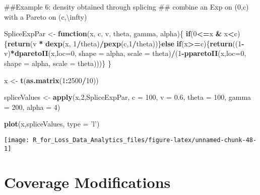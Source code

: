 \documentclass[]{book}
\newenvironment{Shaded}{\begin{snugshade}}{\end{snugshade}}
\newcommand{\KeywordTok}[1]{\textcolor[rgb]{0.13,0.29,0.53}{\textbf{#1}}}
\newcommand{\DataTypeTok}[1]{\textcolor[rgb]{0.13,0.29,0.53}{#1}}
\newcommand{\DecValTok}[1]{\textcolor[rgb]{0.00,0.00,0.81}{#1}}
\newcommand{\FloatTok}[1]{\textcolor[rgb]{0.00,0.00,0.81}{#1}}
\newcommand{\StringTok}[1]{\textcolor[rgb]{0.31,0.60,0.02}{#1}}
\newcommand{\ControlFlowTok}[1]{\textcolor[rgb]{0.13,0.29,0.53}{\textbf{#1}}}
\newcommand{\OperatorTok}[1]{\textcolor[rgb]{0.81,0.36,0.00}{\textbf{#1}}}
\newcommand{\NormalTok}[1]{#1}
\theoremstyle{definition}
\theoremstyle{definition}
\theoremstyle{definition}
\theoremstyle{remark}
\begin{document}
\begin{Shaded}
\begin{Highlighting}[]
\NormalTok{##Example 6: density obtained through splicing}
\NormalTok{## combine an Exp on (0,c) with a Pareto on (c,\textbackslash{}infty)}

\NormalTok{SpliceExpPar <-}\StringTok{ }\ControlFlowTok{function}\NormalTok{(x, c, v, theta, gamma, alpha)\{}
  \ControlFlowTok{if}\NormalTok{(}\DecValTok{0}\OperatorTok{<=}\NormalTok{x }\OperatorTok{&}\StringTok{ }\NormalTok{x}\OperatorTok{<}\NormalTok{c)\{}\KeywordTok{return}\NormalTok{(v }\OperatorTok{*}\StringTok{ }\KeywordTok{dexp}\NormalTok{(x, }\DecValTok{1}\OperatorTok{/}\NormalTok{theta)}\OperatorTok{/}\KeywordTok{pexp}\NormalTok{(c,}\DecValTok{1}\OperatorTok{/}\NormalTok{theta))\}}\ControlFlowTok{else}
    \ControlFlowTok{if}\NormalTok{(x}\OperatorTok{>=}\NormalTok{c)\{}\KeywordTok{return}\NormalTok{((}\DecValTok{1}\OperatorTok{-}\NormalTok{v)}\OperatorTok{*}\KeywordTok{dparetoII}\NormalTok{(x,}\DataTypeTok{loc=}\DecValTok{0}\NormalTok{, }\DataTypeTok{shape =}\NormalTok{ alpha, }\DataTypeTok{scale =}\NormalTok{ theta)}\OperatorTok{/}\NormalTok{(}\DecValTok{1}\OperatorTok{-}\KeywordTok{pparetoII}\NormalTok{(x,}\DataTypeTok{loc=}\DecValTok{0}\NormalTok{, }\DataTypeTok{shape =}\NormalTok{ alpha, }\DataTypeTok{scale =}\NormalTok{ theta)))\}}
\NormalTok{\}}

\NormalTok{x <-}\StringTok{ }\KeywordTok{t}\NormalTok{(}\KeywordTok{as.matrix}\NormalTok{(}\DecValTok{1}\OperatorTok{:}\DecValTok{2500}\OperatorTok{/}\DecValTok{10}\NormalTok{))}

\NormalTok{spliceValues <-}\StringTok{ }\KeywordTok{apply}\NormalTok{(x,}\DecValTok{2}\NormalTok{,SpliceExpPar, }\DataTypeTok{c =} \DecValTok{100}\NormalTok{, }\DataTypeTok{v =} \FloatTok{0.6}\NormalTok{, }\DataTypeTok{theta =} \DecValTok{100}\NormalTok{, }\DataTypeTok{gamma =} \DecValTok{200}\NormalTok{, }\DataTypeTok{alpha =} \DecValTok{4}\NormalTok{)}

\KeywordTok{plot}\NormalTok{(x,spliceValues, }\DataTypeTok{type =} \StringTok{'l'}\NormalTok{)}
\end{Highlighting}
\end{Shaded}

\begin{center}\texttt{[image: R\_for\_Loss\_Data\_Analytics\_files/figure-latex/unnamed-chunk-48-1]} \end{center}

\section{Coverage Modifications}\label{coverage-modifications}
\end{document}
